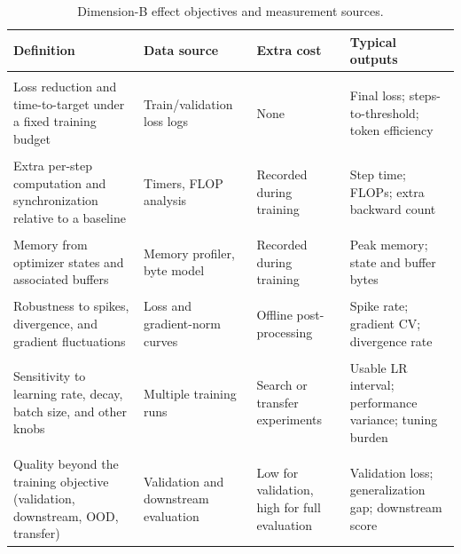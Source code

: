 \begin{table}[!t]
  \centering
  \caption{Dimension-B effect objectives and measurement sources.}
  \label{tab:effect_objectives}
  \scriptsize
  \setlength{\tabcolsep}{1.5pt}
  \renewcommand{\arraystretch}{1.08}
  \begin{tabularx}{\textwidth}{@{}Y p{0.17\textwidth}p{0.14\textwidth}Y@{}}
    \toprule
    Definition & Data source & Extra cost & Typical outputs \\
    \midrule
     \\
      Loss reduction and time-to-target under a fixed training budget
      & Train/validation loss logs
      & None
      & Final loss; steps-to-threshold; token efficiency \\
     \\
      Extra per-step computation and synchronization relative to a baseline
      & Timers, FLOP analysis
      & Recorded during training
      & Step time; FLOPs; extra backward count \\
     \\
      Memory from optimizer states and associated buffers
      & Memory profiler, byte model
      & Recorded during training
      & Peak memory; state and buffer bytes \\
     \\
      Robustness to spikes, divergence, and gradient fluctuations
      & Loss and gradient-norm curves
      & Offline post-processing
      & Spike rate; gradient CV; divergence rate \\
     \\
      Sensitivity to learning rate, decay, batch size, and other knobs
      & Multiple training runs
      & Search or transfer experiments
      & Usable LR interval; performance variance; tuning burden \\
     \\
      Quality beyond the training objective (validation, downstream, OOD, transfer)
      & Validation and downstream evaluation
      & Low for validation, high for full evaluation
      & Validation loss; generalization gap; downstream score \\
    \bottomrule
  \end{tabularx}
\end{table}
